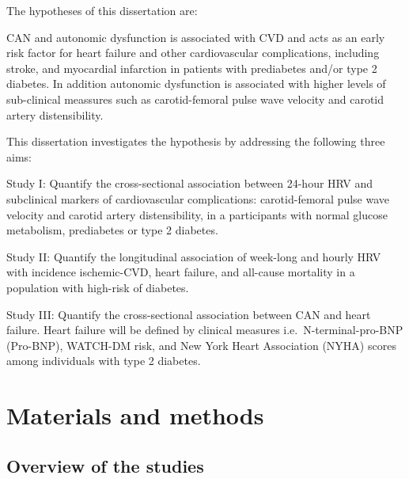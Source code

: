\documentclass[
  a4paper,
  headsepline=true,
  open=any]{scrbook}
\begin{document}
The hypotheses of this dissertation are:

CAN and autonomic dysfunction is associated with CVD and acts as an
early risk factor for heart failure and other cardiovascular
complications, including stroke, and myocardial infarction in patients
with prediabetes and/or type 2 diabetes. In addition autonomic
dysfunction is associated with higher levels of sub-clinical meassures
such as carotid-femoral pulse wave velocity and carotid artery
distensibility.

This dissertation investigates the hypothesis by addressing the
following three aims:

Study I: Quantify the cross-sectional association between 24-hour HRV
and subclinical markers of cardiovascular complications: carotid-femoral
pulse wave velocity and carotid artery distensibility, in a participants
with normal glucose metabolism, prediabetes or type 2 diabetes.

Study II: Quantify the longitudinal association of week-long and hourly
HRV with incidence ischemic-CVD, heart failure, and all-cause mortality
in a population with high-risk of diabetes.

Study III: Quantify the cross-sectional association between CAN and
heart failure. Heart failure will be defined by clinical measures
i.e.~N-terminal-pro-BNP (Pro-BNP), WATCH-DM risk, and New York Heart
Association (NYHA) scores among individuals with type 2 diabetes.


\hypertarget{materials-and-methods}{%
\chapter{Materials and methods}\label{materials-and-methods}}

\hypertarget{overview-of-the-studies}{%
\section{Overview of the studies}\label{overview-of-the-studies}}
\end{document}
